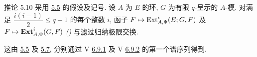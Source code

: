 \begin{enonce*}{推论 5.10}
采用\pageoriginale{} \hyperref[VI.cor5.5]{5.5} 的假设及记号.
设 $A$ 为 $E$ 的环,
$G$ 为有限 $q$-呈示的 $A$-模.
对满足 $\dfrac{i(i-1)}{2}\leq q-1$ 的每个整数 $i$,
函子 $F\mapsto\operatorname{Ext}^i_{A,\Phi}(E;G,F)$
及 $F\mapsto\operatorname{\mathbf{Ext}}^i_{A,\Phi}(G,F)$
\emph{()}
与滤过归纳极限交换.
\end{enonce*}

这由 \hyperref[VI.cor5.5]{5.5} 及 \hyperref[VI.prop5.7]{5.7},
分别通过 V \hyperref[V.6.9.1]{6.9.1}
及 V \hyperref[V.6.9.2]{6.9.2} 的第一个谱序列得到.





